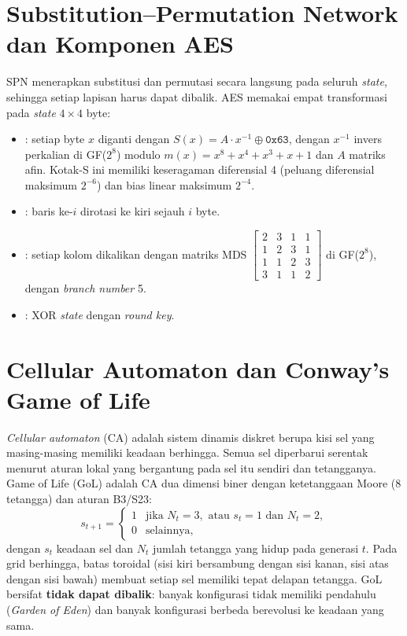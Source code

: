 \section{Substitution--Permutation Network dan Komponen AES}
SPN menerapkan substitusi dan permutasi secara langsung pada seluruh \textit{state}, sehingga setiap lapisan harus dapat dibalik. AES \cite{fips197, daemen2002} memakai empat transformasi pada \textit{state} $4 \times 4$ byte:
\begin{itemize}
    \item {}: setiap byte $x$ diganti dengan $S(x) = A \cdot x^{-1} \oplus \texttt{0x63}$, dengan $x^{-1}$ invers perkalian di GF($2^8$) modulo $m(x) = x^8 + x^4 + x^3 + x + 1$ dan $A$ matriks afin. Kotak-S ini memiliki keseragaman diferensial 4 (peluang diferensial maksimum $2^{-6}$) dan bias linear maksimum $2^{-4}$.
    \item {}: baris ke-$i$ dirotasi ke kiri sejauh $i$ byte.
    \item {}: setiap kolom dikalikan dengan matriks MDS $\left[\begin{smallmatrix}2&3&1&1\\1&2&3&1\\1&1&2&3\\3&1&1&2\end{smallmatrix}\right]$ di GF($2^8$), dengan \textit{branch number} 5.
    \item {}: XOR \textit{state} dengan \textit{round key}.
\end{itemize}

\section{Cellular Automaton dan Conway's Game of Life}
\textit{Cellular automaton} (CA) adalah sistem dinamis diskret berupa kisi sel yang masing-masing memiliki keadaan berhingga. Semua sel diperbarui serentak menurut aturan lokal yang bergantung pada sel itu sendiri dan tetangganya. Game of Life (GoL) \cite{gardner1970} adalah CA dua dimensi biner dengan ketetanggaan Moore (8 tetangga) dan aturan B3/S23:
\begin{equation}
    s_{t+1} =
    \begin{cases}
        1 & \text{jika } N_t = 3, \text{ atau } s_t = 1 \text{ dan } N_t = 2,\\
        0 & \text{selainnya},
    \end{cases}
    \label{eq:gol}
\end{equation}
dengan $s_t$ keadaan sel dan $N_t$ jumlah tetangga yang hidup pada generasi $t$. Pada grid berhingga, batas toroidal (sisi kiri bersambung dengan sisi kanan, sisi atas dengan sisi bawah) membuat setiap sel memiliki tepat delapan tetangga. GoL bersifat \textbf{tidak dapat dibalik}: banyak konfigurasi tidak memiliki pendahulu (\textit{Garden of Eden}) dan banyak konfigurasi berbeda berevolusi ke keadaan yang sama.

